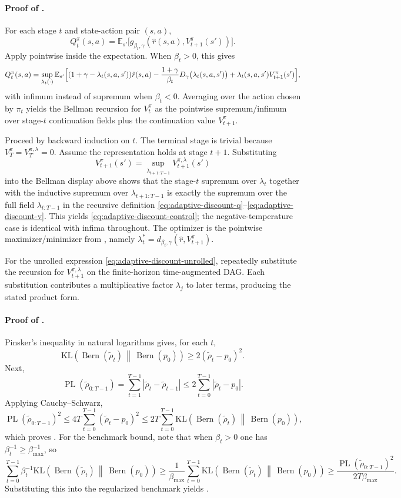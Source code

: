 \documentclass{article}
\theoremstyle{remark}
\DeclareMathOperator{\Bern}{Bern}
\newcommand{\E}{\mathbb{E}}
\newcommand{\KL}{\mathrm{KL}}
\newcommand{\pprior}{p_0}
\newcommand{\KLbin}[2]{\KL\!\left(\Bern(#1)\,\middle\|\,\Bern(#2)\right)}
\DeclareMathOperator{\PL}{PL}
\begin{document}
\paragraph{Proof of .}
For each stage $t$ and state-action pair $(s,a)$,
\[
Q_t^{\pi}(s,a)=\E_{s'}\bigl[g_{\beta_t,\gamma}(\hat r(s,a),V_{t+1}^{\pi}(s'))\bigr].
\]
Apply  pointwise inside the expectation. When $\beta_t>0$, this gives
\begin{align*}
Q_t^{\pi}(s,a)
=\sup_{\lambda_t(\cdot)}\E_{s'}\Bigl[
(1+\gamma-\lambda_t(s,a,s'))\hat r(s,a)
-\frac{1+\gamma}{\beta_t}D_\gamma\bigl(\lambda_t(s,a,s')\bigr)
+\lambda_t(s,a,s')V_{t+1}^{\pi}(s')
\Bigr],
\end{align*}
with infimum instead of supremum when $\beta_t<0$. Averaging over the action chosen by $\pi_t$ yields the Bellman recursion for $V_t^{\pi}$ as the pointwise supremum/infimum over stage-$t$ continuation fields plus the continuation value $V_{t+1}^{\pi}$.

Proceed by backward induction on $t$. The terminal stage is trivial because $V_T^{\pi}=V_T^{\pi,\lambda}=0$. Assume the representation holds at stage $t+1$. Substituting
\[
V_{t+1}^{\pi}(s')=\sup_{\lambda_{t+1:T-1}}V_{t+1}^{\pi,\lambda}(s')
\]
into the Bellman display above shows that the stage-$t$ supremum over $\lambda_t$ together with the inductive supremum over $\lambda_{t+1:T-1}$ is exactly the supremum over the full field $\lambda_{t:T-1}$ in the recursive definition \eqref{eq:adaptive-discount-q}--\eqref{eq:adaptive-discount-v}. This yields \eqref{eq:adaptive-discount-control}; the negative-temperature case is identical with infima throughout. The optimizer is the pointwise maximizer/minimizer from , namely $\lambda_t^*=d_{\beta_t,\gamma}(\hat r,V_{t+1}^{\pi})$.

For the unrolled expression \eqref{eq:adaptive-discount-unrolled}, repeatedly substitute the recursion for $V_{t+1}^{\pi,\lambda}$ on the finite-horizon time-augmented DAG. Each substitution contributes a multiplicative factor $\lambda_j$ to later terms, producing the stated product form.

\paragraph{Proof of .}
Pinsker's inequality in natural logarithms gives, for each $t$,
\[
\KLbin{\tilde\rho_t}{\pprior} \ge 2(\tilde\rho_t-\pprior)^2.
\]
Next,
\[
\PL(\tilde\rho_{0:T-1})
=\sum_{t=1}^{T-1}|\tilde\rho_t-\tilde\rho_{t-1}|
\le 2\sum_{t=0}^{T-1}|\tilde\rho_t-\pprior|.
\]
Applying Cauchy--Schwarz,
\[
\PL(\tilde\rho_{0:T-1})^2\le 4T\sum_{t=0}^{T-1}(\tilde\rho_t-\pprior)^2
\le 2T\sum_{t=0}^{T-1}\KLbin{\tilde\rho_t}{\pprior},
\]
which proves .
For the benchmark bound, note that when $\beta_t>0$ one has $\beta_t^{-1}\ge \beta_{\max}^{-1}$, so
\[
\sum_{t=0}^{T-1}\beta_t^{-1}\KLbin{\tilde\rho_t}{\pprior}
\ge \frac{1}{\beta_{\max}}\sum_{t=0}^{T-1}\KLbin{\tilde\rho_t}{\pprior}
\ge \frac{\PL(\tilde\rho_{0:T-1})^2}{2T\beta_{\max}}.
\]
Substituting this into the regularized benchmark yields .
\end{document}
